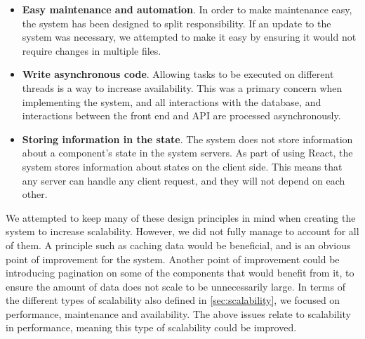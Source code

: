 \begin{itemize}
    \item \textbf{Easy maintenance and automation}. In order to make maintenance easy, the system has been designed to split responsibility.
    If an update to the system was necessary, we attempted to make it easy by ensuring it would not require changes in multiple files.
    \item \textbf{Write asynchronous code}. Allowing tasks to be executed on different threads is a way to increase availability. 
    This was a primary concern when implementing the system, and all interactions with the database, and interactions between the front end and API are processed asynchronously.
    \item \textbf{Storing information in the state}. The system does not store information about a component's state in the system servers.
    As part of using React, the system stores information about states on the client side.
    This means that any server can handle any client request, and they will not depend on each other.
\end{itemize}
We attempted to keep many of these design principles in mind when creating the system to increase scalability.
However, we did not fully manage to account for all of them.
A principle such as caching data would be beneficial, and is an obvious point of improvement for the system.
Another point of improvement could be introducing pagination on some of the components that would benefit from it, to ensure the amount of data does not scale to be unnecessarily large.
In terms of the different types of scalability also defined in \autoref{sec:scalability}, we focused on performance, maintenance and availability.
The above issues relate to scalability in performance, meaning this type of scalability could be improved.
